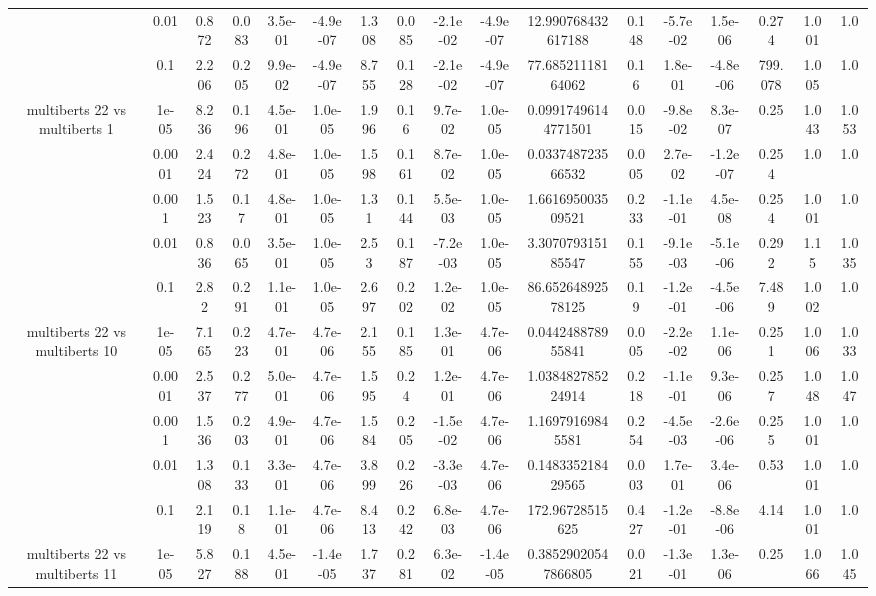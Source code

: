 \begin{tabular}{|c|c|c|c|c|c|c|c|c|c|c|c|c|c|c|c|c|}
 & 0.01 & 0.872 & 0.083 & 3.5e-01 & -4.9e-07 & 1.308 & 0.085 & -2.1e-02 & -4.9e-07 & 12.990768432617188 & 0.148 & -5.7e-02 & 1.5e-06 & 0.274 & 1.001 & 1.0 \\
 & 0.1 & 2.206 & 0.205 & 9.9e-02 & -4.9e-07 & 8.755 & 0.128 & -2.1e-02 & -4.9e-07 & 77.68521118164062 & 0.16 & 1.8e-01 & -4.8e-06 & 799.078 & 1.005 & 1.0 \\
\hline
\multirow{5}{*}{multiberts 22 vs multiberts 1} & 1e-05 & 8.236 & 0.196 & 4.5e-01 & 1.0e-05 & 1.996 & 0.16 & 9.7e-02 & 1.0e-05 & 0.09917496144771501 & 0.015 & -9.8e-02 & 8.3e-07 & 0.25 & 1.043 & 1.053 \\
 & 0.0001 & 2.424 & 0.272 & 4.8e-01 & 1.0e-05 & 1.598 & 0.161 & 8.7e-02 & 1.0e-05 & 0.033748723566532 & 0.005 & 2.7e-02 & -1.2e-07 & 0.254 & 1.0 & 1.0 \\
 & 0.001 & 1.523 & 0.17 & 4.8e-01 & 1.0e-05 & 1.31 & 0.144 & 5.5e-03 & 1.0e-05 & 1.661695003509521 & 0.233 & -1.1e-01 & 4.5e-08 & 0.254 & 1.001 & 1.0 \\
 & 0.01 & 0.836 & 0.065 & 3.5e-01 & 1.0e-05 & 2.53 & 0.187 & -7.2e-03 & 1.0e-05 & 3.307079315185547 & 0.155 & -9.1e-03 & -5.1e-06 & 0.292 & 1.15 & 1.035 \\
 & 0.1 & 2.82 & 0.291 & 1.1e-01 & 1.0e-05 & 2.697 & 0.202 & 1.2e-02 & 1.0e-05 & 86.65264892578125 & 0.19 & -1.2e-01 & -4.5e-06 & 7.489 & 1.002 & 1.0 \\
\hline
\multirow{5}{*}{multiberts 22 vs multiberts 10} & 1e-05 & 7.165 & 0.223 & 4.7e-01 & 4.7e-06 & 2.155 & 0.185 & 1.3e-01 & 4.7e-06 & 0.044248878955841 & 0.005 & -2.2e-02 & 1.1e-06 & 0.251 & 1.006 & 1.033 \\
 & 0.0001 & 2.537 & 0.277 & 5.0e-01 & 4.7e-06 & 1.595 & 0.24 & 1.2e-01 & 4.7e-06 & 1.038482785224914 & 0.218 & -1.1e-01 & 9.3e-06 & 0.257 & 1.048 & 1.047 \\
 & 0.001 & 1.536 & 0.203 & 4.9e-01 & 4.7e-06 & 1.584 & 0.205 & -1.5e-02 & 4.7e-06 & 1.16979169845581 & 0.254 & -4.5e-03 & -2.6e-06 & 0.255 & 1.001 & 1.0 \\
 & 0.01 & 1.308 & 0.133 & 3.3e-01 & 4.7e-06 & 3.899 & 0.226 & -3.3e-03 & 4.7e-06 & 0.148335218429565 & 0.003 & 1.7e-01 & 3.4e-06 & 0.53 & 1.001 & 1.0 \\
 & 0.1 & 2.119 & 0.18 & 1.1e-01 & 4.7e-06 & 8.413 & 0.242 & 6.8e-03 & 4.7e-06 & 172.96728515625 & 0.427 & -1.2e-01 & -8.8e-06 & 4.14 & 1.001 & 1.0 \\
\hline
\multirow{5}{*}{multiberts 22 vs multiberts 11} & 1e-05 & 5.827 & 0.188 & 4.5e-01 & -1.4e-05 & 1.737 & 0.281 & 6.3e-02 & -1.4e-05 & 0.38529020547866805 & 0.021 & -1.3e-01 & 1.3e-06 & 0.25 & 1.066 & 1.045 \\

\end{tabular}
